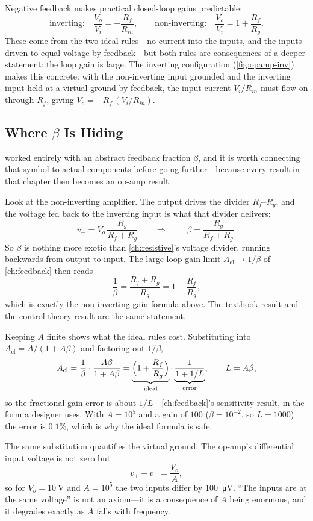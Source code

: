 Negative feedback makes practical closed-loop gains predictable:
\[
\text{inverting:}\quad \frac{V_o}{V_i}=-\frac{R_f}{R_{in}},
\qquad
\text{non-inverting:}\quad \frac{V_o}{V_i}=1+\frac{R_f}{R_g}.
\]
These come from the two ideal rules---no current into the inputs, and the inputs
driven to equal voltage by feedback---but both rules are consequences of a deeper
statement: the loop gain is large. The inverting configuration
(\cref{fig:opamp-inv}) makes this concrete: with the non-inverting input grounded
and the inverting input held at a virtual ground by feedback, the input current
\(V_i/R_{in}\) must flow on through \(R_f\), giving \(V_o=-R_f\,(V_i/R_{in})\).

\subsection{Where \texorpdfstring{\(\beta\)}{beta} Is Hiding}
\label{sec:beta-resistors}
 worked entirely with an abstract feedback fraction \(\beta\), and
it is worth connecting that symbol to actual components before going further---because
every result in that chapter then becomes an op-amp result.

Look at the non-inverting amplifier. The output drives the divider \(R_f\)--\(R_g\),
and the voltage fed back to the inverting input is what that divider delivers:
\[
v_-=V_o\,\frac{R_g}{R_f+R_g}
\qquad\Longrightarrow\qquad
\boxed{\;\beta=\frac{R_g}{R_f+R_g}\;}
\]
So \(\beta\) is nothing more exotic than \cref{ch:resistive}'s voltage divider,
running backwards from output to input. The large-loop-gain limit
\(A_{\mathrm{cl}}\to1/\beta\) of \cref{ch:feedback} then reads
\[
\frac{1}{\beta}=\frac{R_f+R_g}{R_g}=1+\frac{R_f}{R_g},
\]
which is exactly the non-inverting gain formula above. The textbook result and the
control-theory result are the same statement.

Keeping \(A\) finite shows what the ideal rules cost. Substituting into
\(A_{\mathrm{cl}}=A/(1+A\beta)\) and factoring out \(1/\beta\),
\[
A_{\mathrm{cl}}=\frac{1}{\beta}\cdot\frac{A\beta}{1+A\beta}
=\underbrace{\Bigl(1+\frac{R_f}{R_g}\Bigr)}_{\text{ideal}}
\cdot\underbrace{\frac{1}{1+1/L}}_{\text{error}},
\qquad L=A\beta ,
\]
so the fractional gain error is about \(1/L\)---\cref{ch:feedback}'s sensitivity
result, in the form a designer uses. With \(A=10^5\) and a gain of \(100\)
(\(\beta=10^{-2}\), so \(L=1000\)) the error is \(0.1\%\), which is why the ideal
formula is safe.

The same substitution quantifies the virtual ground. The op-amp's differential input
voltage is not zero but
\[
v_+-v_-=\frac{V_o}{A},
\]
so for \(V_o=\SI{10}{\volt}\) and \(A=10^5\) the two inputs differ by
\SI{100}{\micro\volt}. ``The inputs are at the same voltage'' is not an axiom---it is
a consequence of \(A\) being enormous, and it degrades exactly as \(A\) falls with
frequency.

